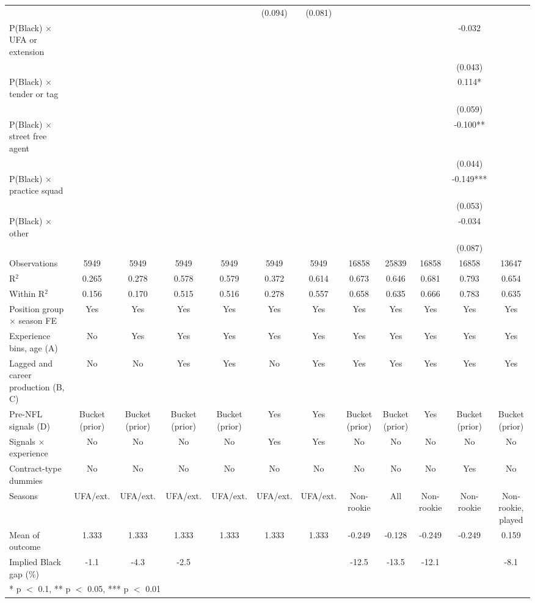 \begin{table}[H]
{\begin{tabular}[t]{lccccccccccc}
 &  &  &  &  & (0.094) & (0.081) &  &  &  &  & \\
P(Black) $\times$ UFA or extension &  &  &  &  &  &  &  &  &  & -0.032 & \\
 &  &  &  &  &  &  &  &  &  & (0.043) & \\
P(Black) $\times$ tender or tag &  &  &  &  &  &  &  &  &  & 0.114* & \\
 &  &  &  &  &  &  &  &  &  & (0.059) & \\
P(Black) $\times$ street free agent &  &  &  &  &  &  &  &  &  & -0.100** & \\
 &  &  &  &  &  &  &  &  &  & (0.044) & \\
P(Black) $\times$ practice squad &  &  &  &  &  &  &  &  &  & -0.149*** & \\
 &  &  &  &  &  &  &  &  &  & (0.053) & \\
P(Black) $\times$ other &  &  &  &  &  &  &  &  &  & -0.034 & \\
 &  &  &  &  &  &  &  &  &  & (0.087) & \\
\midrule
Observations & 5949 & 5949 & 5949 & 5949 & 5949 & 5949 & 16858 & 25839 & 16858 & 16858 & 13647\\
R$^2$ & 0.265 & 0.278 & 0.578 & 0.579 & 0.372 & 0.614 & 0.673 & 0.646 & 0.681 & 0.793 & 0.654\\
Within R$^2$ & 0.156 & 0.170 & 0.515 & 0.516 & 0.278 & 0.557 & 0.658 & 0.635 & 0.666 & 0.783 & 0.635\\
Position group $\times$ season FE & Yes & Yes & Yes & Yes & Yes & Yes & Yes & Yes & Yes & Yes & Yes\\
Experience bins, age (A) & No & Yes & Yes & Yes & Yes & Yes & Yes & Yes & Yes & Yes & Yes\\
Lagged and career production (B, C) & No & No & Yes & Yes & No & Yes & Yes & Yes & Yes & Yes & Yes\\
Pre-NFL signals (D) & Bucket (prior) & Bucket (prior) & Bucket (prior) & Bucket (prior) & Yes & Yes & Bucket (prior) & Bucket (prior) & Yes & Bucket (prior) & Bucket (prior)\\
Signals $\times$ experience & No & No & No & No & Yes & Yes & No & No & No & No & No\\
Contract-type dummies & No & No & No & No & No & No & No & No & No & Yes & No\\
Seasons & UFA/ext. & UFA/ext. & UFA/ext. & UFA/ext. & UFA/ext. & UFA/ext. & Non-rookie & All & Non-rookie & Non-rookie & Non-rookie, played\\
Mean of outcome & 1.333 & 1.333 & 1.333 & 1.333 & 1.333 & 1.333 & -0.249 & -0.128 & -0.249 & -0.249 & 0.159\\
Implied Black gap (\%) & -1.1 & -4.3 & -2.5 &  &  &  & -12.5 & -13.5 & -12.1 &  & -8.1\\
\bottomrule
\multicolumn{12}{l}{\rule{0pt}{1em}* p $<$ 0.1, ** p $<$ 0.05, *** p $<$ 0.01}\\
\end{tabular}}
\end{table}

